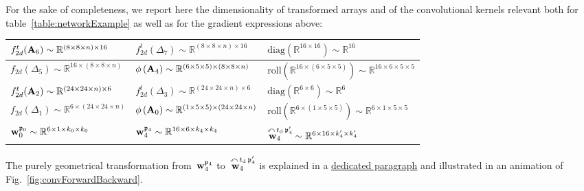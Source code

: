 \documentclass{article}
\begin{document}
\begin{table}
{For the sake of completeness, we report here the dimensionality of transformed arrays and of the convolutional kernels relevant both for table~\ref{table:networkExample} as well as for the gradient expressions above:
\begin{center}
\begin{tabular}{|g:g:g|}
\hline
\rule{0pt}{1.1\normalbaselineskip}
$f_{2d}^t({\bf A}_6) \sim \mathbb{R}^{(8\times 8\times n)\times 16}$ & $f_{2d}^t(\Delta_7) \sim \mathbb{R}^{(8\times 8\times n)\times 16} $ & $\text{diag} \left( \mathbb{R}^{16\times 16} \right) \sim \mathbb{R}^{16} $ \\[0.3em]
\hline
\rule{0pt}{1.1\normalbaselineskip}
$f_{2d}(\Delta_5) \sim \mathbb{R}^{16\times (8\times 8\times n)}$ & $\phi \left( {\bf A}_4 \right) \sim \mathbb{R}^{(6\times 5\times 5)\times (8\times 8\times n)}$ & $\text{roll} \left( \mathbb{R}^{16\times (6\times 5\times 5)} \right) \sim \mathbb{R}^{16\times 6\times 5\times 5}$ \\[0.3em]
\hline
\rule{0pt}{1.1\normalbaselineskip}
$f_{2d}^t({\bf A}_2) \sim \mathbb{R}^{(24\times 24\times n)\times 6}$ & $f_{2d}^t(\Delta_3) \sim \mathbb{R}^{(24\times 24\times n)\times 6} $ & $\text{diag} \left( \mathbb{R}^{6\times 6} \right) \sim \mathbb{R}^6 $ \\[0.3em]
\hline
\rule{0pt}{1.1\normalbaselineskip}
$f_{2d}(\Delta_1) \sim \mathbb{R}^{6\times (24\times 24\times n)}$ & $\phi \left( {\bf A}_0 \right) \sim \mathbb{R}^{(1\times 5\times 5)\times (24\times 24\times n)}$ & $\text{roll} \left( \mathbb{R}^{6\times (1\times 5\times 5)} \right) \sim \mathbb{R}^{6\times 1\times 5\times 5}$ \\[0.3em]
\hline \hline
\rule{0pt}{1.1\normalbaselineskip}
${\bf w}_0^{\mathfrak{p}_0} \sim \mathbb{R}^{6\times1\times k_0\times k_0} $ & ${\bf w}_4^{\mathfrak{p}_4} \sim \mathbb{R}^{16\times6\times k_4\times k_4}$ & $\overset{\curvearrowleft \, t_{\text{d}} \, \mathfrak{p}_4^\prime }{{\bf w}_{4\,\,\,\,\,\,\,\,}} \sim \mathbb{R}^{6\times 16\times k_4^\prime \times k_4^\prime}  $ \\[0.3em]
\hline
\end{tabular}
\end{center}
The purely geometrical transformation from~${\bf w}_4^{\mathfrak{p}_4}$ to~$\overset{\curvearrowleft \, t_{\text{d}} \, \mathfrak{p}_4^\prime }{{\bf w}_{4\,\,\,\,\,\,\,\,}}$ is explained in a \hyperlink{convTransf}{dedicated paragraph} and illustrated in an animation of Fig.~\ref{fig:convForwardBackward}.}
\label{table:networkParams}
\end{table}
\end{document}
